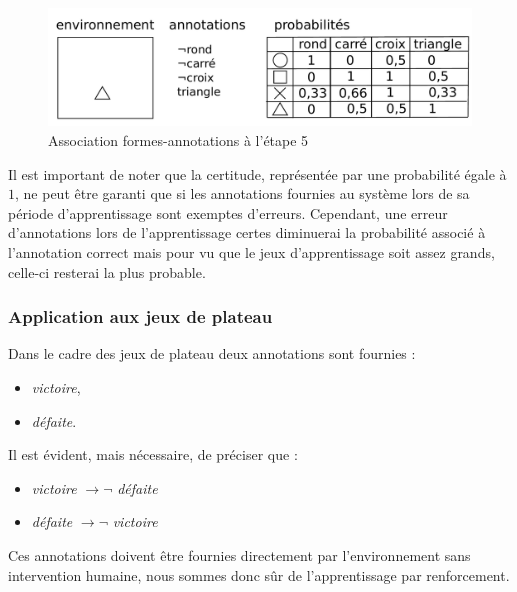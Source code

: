 \begin{figure}[H] 
\includegraphics[width=\textwidth]{files/raisonneur/annotations_5} 
\caption{Association formes-annotations à l'étape 5} 
\label{img_annotations_5}
\end{figure}

Il est important de noter que la certitude, représentée par une probabilité égale à $1$, ne peut être garanti que si les annotations fournies au système lors de sa période d'apprentissage sont exemptes d'erreurs. Cependant, une erreur d'annotations lors de l'apprentissage certes diminuerai la probabilité associé à l'annotation correct mais pour vu que le jeux d'apprentissage soit assez grands, celle-ci resterai la plus probable.

\subsubsection{Application aux jeux de plateau}

Dans le cadre des jeux de plateau deux annotations sont fournies :
\begin{itemize}
\item \emph{victoire},
\item \emph{défaite}.
\end{itemize}
Il est évident, mais nécessaire, de préciser que :
\begin{itemize}
\item \emph{victoire} $\rightarrow{}\neg{}$ \emph{défaite}
\item \emph{défaite} $\rightarrow{}\neg{}$ \emph{victoire}
\end{itemize}

Ces annotations doivent être fournies directement par l'environnement sans intervention humaine, nous sommes donc sûr de l'apprentissage par renforcement.
